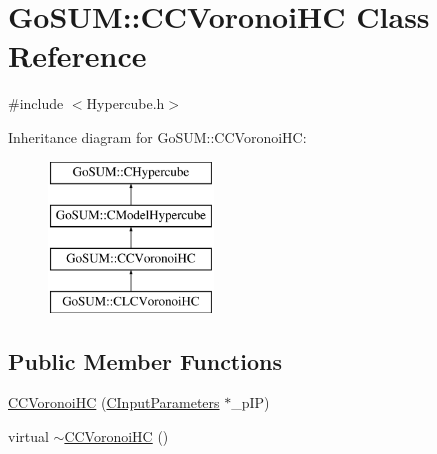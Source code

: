 \hypertarget{class_go_s_u_m_1_1_c_c_voronoi_h_c}{\section{Go\-S\-U\-M\-:\-:C\-C\-Voronoi\-H\-C Class Reference}
\label{class_go_s_u_m_1_1_c_c_voronoi_h_c}
}


{\ttfamily \#include $<$Hypercube.\-h$>$}

Inheritance diagram for Go\-S\-U\-M\-:\-:C\-C\-Voronoi\-H\-C\-:\begin{figure}[H]
\begin{center}
\leavevmode
\includegraphics[height=4.000000cm]{class_go_s_u_m_1_1_c_c_voronoi_h_c}
\end{center}
\end{figure}
\subsection*{Public Member Functions}
\begin{DoxyCompactItemize}
\item 
\hyperlink{class_go_s_u_m_1_1_c_c_voronoi_h_c_ad3998fef79b2c64980c03fc2e3010c93}{C\-C\-Voronoi\-H\-C} (\hyperlink{class_go_s_u_m_1_1_c_input_parameters}{C\-Input\-Parameters} $\ast$\-\_\-p\-I\-P)
\item 
virtual \hyperlink{class_go_s_u_m_1_1_c_c_voronoi_h_c_afdcece721246023141339525c58256b6}{$\sim$\-C\-C\-Voronoi\-H\-C} ()
\end{DoxyCompactItemize}
